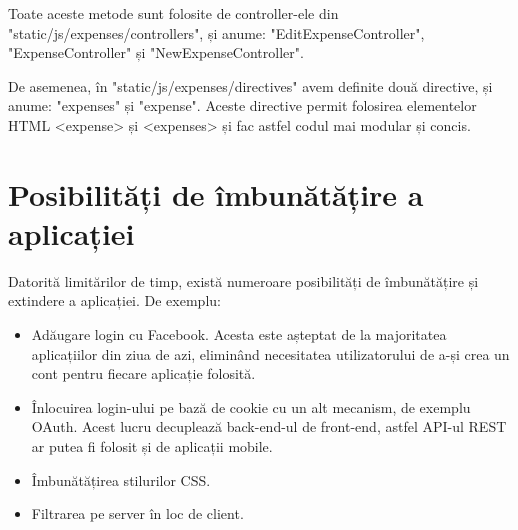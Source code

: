 

Toate aceste metode sunt folosite de controller-ele din
"static/js/expenses/controllers", și anume: "EditExpenseController",
"ExpenseController" și "NewExpenseController".

De asemenea, în "static/js/expenses/directives" avem definite două
directive, și anume: "expenses" și "expense".
Aceste directive permit folosirea elementelor HTML <expense>
și <expenses> și fac astfel codul mai modular și concis.







\section{Posibilități de îmbunătățire a aplicației}

Datorită limitărilor de timp, există numeroare posibilități de 
îmbunătățire și extindere a aplicației. De exemplu:
\begin{itemize}
\item Adăugare login cu Facebook. Acesta este așteptat de la
majoritatea aplicațiilor din ziua de azi, eliminând necesitatea
utilizatorului de a-și crea un cont pentru fiecare aplicație folosită.
\item Înlocuirea login-ului pe bază de cookie cu un alt mecanism,
de exemplu OAuth. Acest lucru decuplează back-end-ul de front-end, 
astfel API-ul REST ar putea fi folosit
și de aplicații mobile.
\item Îmbunătățirea stilurilor CSS.
\item Filtrarea pe server în loc de client.
\end{itemize}
